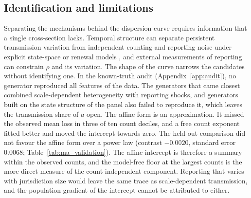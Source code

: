 \subsection{Identification and limitations}
\label{sec:disc-limits}

Separating the mechanisms behind the dispersion curve requires information that a single cross-section lacks. Temporal structure can separate persistent transmission variation from independent counting and reporting noise under explicit state-space or renewal models \citep{koyama2021estimating, knape2008estimability, augermethe2016state}, and external measurements of reporting can constrain $\rho$ and its variation. The shape of the curve narrows the candidates without identifying one. In the known-truth audit (Appendix~\ref{app:audit}), no generator reproduced all features of the data. The generators that came closest combined scale-dependent heterogeneity with reporting shocks, and generators built on the state structure of the panel also failed to reproduce it, which leaves the transmission share of $a$ open. The affine form is an approximation. It missed the observed mean loss in three of ten count deciles, and a free count exponent fitted better and moved the intercept towards zero. The held-out comparison did not favour the affine form over a power law (contrast $-0.0020$, standard error 0.0068; Table~\ref{tab:ma_validation}). The affine intercept is therefore a summary within the observed counts, and the model-free floor at the largest counts is the more direct measure of the count-independent component. Reporting that varies with jurisdiction size would leave the same trace as scale-dependent transmission, and the population gradient of the intercept cannot be attributed to either.

